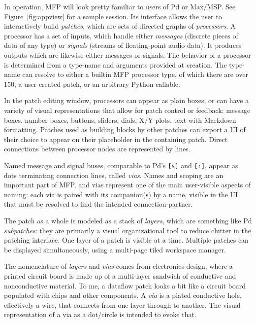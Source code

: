 \documentclass[a4paper]{article}
\begin{document}
In operation, MFP will look pretty familiar to users of Pd or
Max/MSP. See Figure~\ref{fig:appview} for a sample session. Its
interface allows the user to interactively build {\it patches},
which are sets of directed graphs of {\it processors}. A
processor has a set of inputs, which handle either {\it messages}
(discrete pieces of data of any type) or {\it signals} (streams
of floating-point audio data). It produces outputs which are
likewise either messages or signals. The behavior of a processor
is determined from a type-name and arguments provided at
creation. The type-name can resolve to either a builtin MFP
processor type, of which there are over 150, a user-created
patch, or an arbitrary Python callable.

In the patch editing window, processors can appear as plain
boxes, or can have a variety of visual representations that allow
for patch control or feedback: message boxes, number boxes,
buttons, sliders, dials, X/Y plots, text with Markdown
formatting. Patches used as building blocks by other patches can
export a UI of their choice to appear on their placeholder in the
containing patch. Direct connections between processor nodes are
represented by lines.

Named message and signal buses, comparable to Pd's {\tt [s]} and
{\tt [r]}, appear as dots terminating connection lines, called {\it
vias}. Names and scoping are an important part of MFP, and vias
represent one of the main user-visible aspects of naming: each
via is paired with its companion(s) by a name, visible in the UI,
that must be resolved to find the intended connection-partner.

The patch as a whole is modeled as a stack of {\it layers}, which
are something like Pd {\it subpatches}: they are primarily a
visual organizational tool to reduce clutter in the patching
interface. One layer of a patch is visible at a time. Multiple
patches can be displayed simultaneously, using a multi-page tiled
workspace manager.

The nomenclature of {\it layers} and {\it vias} comes from
electronics design, where a printed circuit board is made up of a
multi-layer sandwich of conductive and nonconductive material. To
me, a dataflow patch looks a bit like a circuit board populated
with chips and other components. A {\it via} is a plated
conductive hole, effectively a wire, that connects from one layer
through to another. The visual representation of a via as a
dot/circle is intended to evoke that.
\end{document}

